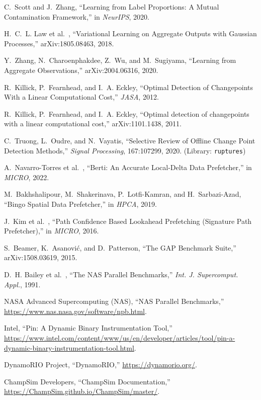 \documentclass[conference]{IEEEtran}
\newcommand{\etal}{et al.\ }
\begin{document}
\begin{thebibliography}{99}
C.~Scott and J.~Zhang, ``Learning from Label Proportions: A Mutual Contamination Framework,'' in \emph{NeurIPS}, 2020.

H.~C.~L. Law \etal, ``Variational Learning on Aggregate Outputs with Gaussian Processes,'' arXiv:1805.08463, 2018.

Y.~Zhang, N.~Charoenphakdee, Z.~Wu, and M.~Sugiyama, ``Learning from Aggregate Observations,'' arXiv:2004.06316, 2020.

R.~Killick, P.~Fearnhead, and I.~A. Eckley, ``Optimal Detection of Changepoints With a Linear Computational Cost,'' \emph{JASA}, 2012.

R.~Killick, P.~Fearnhead, and I.~A. Eckley, ``Optimal detection of changepoints with a linear computational cost,'' arXiv:1101.1438, 2011.

C.~Truong, L.~Oudre, and N.~Vayatis, ``Selective Review of Offline Change Point Detection Methods,'' \emph{Signal Processing}, 167:107299, 2020. (Library: \texttt{ruptures})

A.~Navarro-Torres \etal, ``Berti: An Accurate Local-Delta Data Prefetcher,'' in \emph{MICRO}, 2022.

M.~Bakhshalipour, M.~Shakerinava, P.~Lotfi-Kamran, and H.~Sarbazi-Azad, ``Bingo Spatial Data Prefetcher,'' in \emph{HPCA}, 2019.

J.~Kim \etal, ``Path Confidence Based Lookahead Prefetching (Signature Path Prefetcher),'' in \emph{MICRO}, 2016.

S.~Beamer, K.~Asanovi\'c, and D.~Patterson, ``The GAP Benchmark Suite,'' arXiv:1508.03619, 2015.

D.~H. Bailey \etal, ``The NAS Parallel Benchmarks,'' \emph{Int. J. Supercomput. Appl.}, 1991.

NASA Advanced Supercomputing (NAS), ``NAS Parallel Benchmarks,'' \url{https://www.nas.nasa.gov/software/npb.html}.

Intel, ``Pin: A Dynamic Binary Instrumentation Tool,'' \url{https://www.intel.com/content/www/us/en/developer/articles/tool/pin-a-dynamic-binary-instrumentation-tool.html}.

DynamoRIO Project, ``DynamoRIO,'' \url{https://dynamorio.org/}.

ChampSim Developers, ``ChampSim Documentation,'' \url{https://ChampSim.github.io/ChampSim/master/}.

\end{thebibliography}
\end{document}
